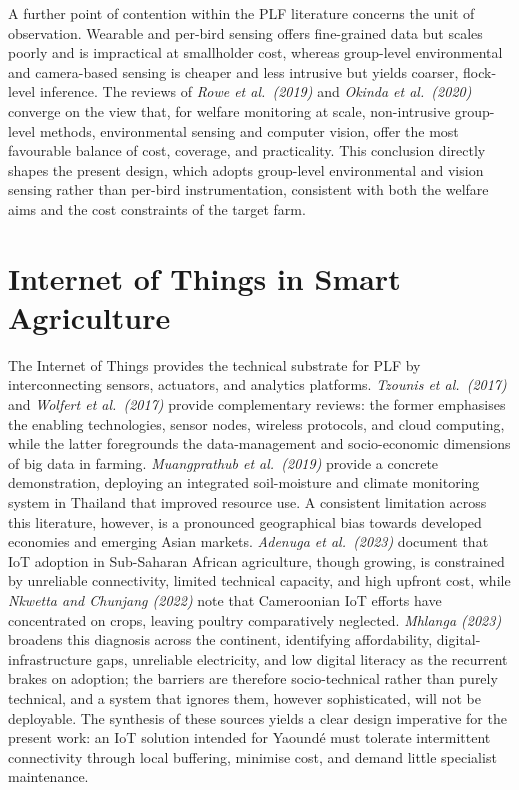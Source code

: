 \documentclass[12pt,a4paper]{report}
\begin{document}
A further point of contention within the PLF literature concerns the unit of observation. Wearable and per-bird sensing offers fine-grained data but scales poorly and is impractical at smallholder cost, whereas group-level environmental and camera-based sensing is cheaper and less intrusive but yields coarser, flock-level inference. The reviews of \textit{Rowe et al.\ (2019)} and \textit{Okinda et al.\ (2020)} converge on the view that, for welfare monitoring at scale, non-intrusive group-level methods, environmental sensing and computer vision, offer the most favourable balance of cost, coverage, and practicality. This conclusion directly shapes the present design, which adopts group-level environmental and vision sensing rather than per-bird instrumentation, consistent with both the welfare aims and the cost constraints of the target farm.

\section{Internet of Things in Smart Agriculture}

The Internet of Things provides the technical substrate for PLF by interconnecting sensors, actuators, and analytics platforms. \textit{Tzounis et al.\ (2017)} and \textit{Wolfert et al.\ (2017)} provide complementary reviews: the former emphasises the enabling technologies, sensor nodes, wireless protocols, and cloud computing, while the latter foregrounds the data-management and socio-economic dimensions of big data in farming. \textit{Muangprathub et al.\ (2019)} provide a concrete demonstration, deploying an integrated soil-moisture and climate monitoring system in Thailand that improved resource use. A consistent limitation across this literature, however, is a pronounced geographical bias towards developed economies and emerging Asian markets. \textit{Adenuga et al.\ (2023)} document that IoT adoption in Sub-Saharan African agriculture, though growing, is constrained by unreliable connectivity, limited technical capacity, and high upfront cost, while \textit{Nkwetta and Chunjang (2022)} note that Cameroonian IoT efforts have concentrated on crops, leaving poultry comparatively neglected. \textit{Mhlanga (2023)} broadens this diagnosis across the continent, identifying affordability, digital-infrastructure gaps, unreliable electricity, and low digital literacy as the recurrent brakes on adoption; the barriers are therefore socio-technical rather than purely technical, and a system that ignores them, however sophisticated, will not be deployable. The synthesis of these sources yields a clear design imperative for the present work: an IoT solution intended for Yaound\'e must tolerate intermittent connectivity through local buffering, minimise cost, and demand little specialist maintenance.
\end{document}
